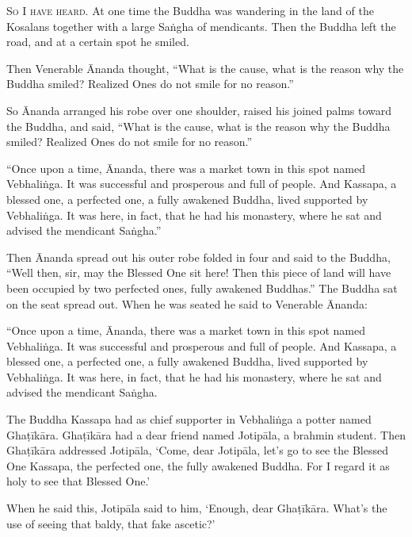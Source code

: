 \documentclass[12pt,openany]{book}%
\newcommand*{\scevam}[1]{\textsc{#1}}
\begin{document}
\scevam{So I have heard. }At one time the Buddha was wandering in the land of the Kosalans together with a large \textsanskrit{Saṅgha} of mendicants. Then the Buddha left the road, and at a certain spot he smiled. 

Then Venerable Ānanda thought, “What is the cause, what is the reason why the Buddha smiled? Realized Ones do not smile for no reason.” 

So Ānanda arranged his robe over one shoulder, raised his joined palms toward the Buddha, and said, “What is the cause, what is the reason why the Buddha smiled? Realized Ones do not smile for no reason.” 

“Once upon a time, Ānanda, there was a market town in this spot named \textsanskrit{Vebhaliṅga}. It was successful and prosperous and full of people. And Kassapa, a blessed one, a perfected one, a fully awakened Buddha, lived supported by \textsanskrit{Vebhaliṅga}. It was here, in fact, that he had his monastery, where he sat and advised the mendicant \textsanskrit{Saṅgha}.” 

Then Ānanda spread out his outer robe folded in four and said to the Buddha, “Well then, sir, may the Blessed One sit here! Then this piece of land will have been occupied by two perfected ones, fully awakened Buddhas.” The Buddha sat on the seat spread out. When he was seated he said to Venerable Ānanda: 

“Once upon a time, Ānanda, there was a market town in this spot named \textsanskrit{Vebhaliṅga}. It was successful and prosperous and full of people. And Kassapa, a blessed one, a perfected one, a fully awakened Buddha, lived supported by \textsanskrit{Vebhaliṅga}. It was here, in fact, that he had his monastery, where he sat and advised the mendicant \textsanskrit{Saṅgha}. 

The Buddha Kassapa had as chief supporter in \textsanskrit{Vebhaliṅga} a potter named \textsanskrit{Ghaṭīkāra}. \textsanskrit{Ghaṭīkāra} had a dear friend named \textsanskrit{Jotipāla}, a brahmin student. Then \textsanskrit{Ghaṭīkāra} addressed \textsanskrit{Jotipāla}, ‘Come, dear \textsanskrit{Jotipāla}, let’s go to see the Blessed One Kassapa, the perfected one, the fully awakened Buddha. For I regard it as holy to see that Blessed One.’ 

When he said this, \textsanskrit{Jotipāla} said to him, ‘Enough, dear \textsanskrit{Ghaṭīkāra}. What’s the use of seeing that baldy, that fake ascetic?’ 
\end{document}
